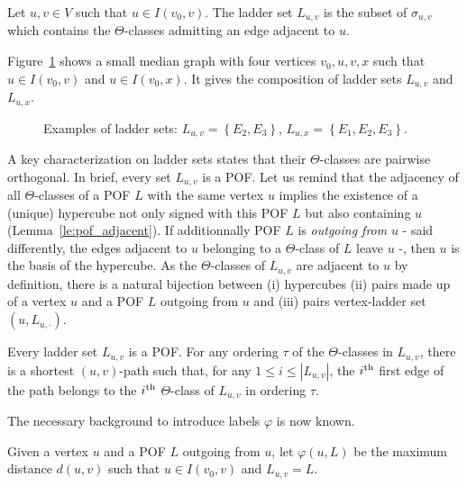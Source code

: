 \documentclass[a4paper,UKenglish,numberwithinsect,cleveref, autoref,anonymous]{lipics-v2021}
\newcommand{\set}[1]{\left\{ #1 \right\}}
\newcommand{\card}[1]{\left| #1 \right|}
\newcommand{\ith}[1]{#1^{\mbox{\scriptsize{th}}}}
\begin{document}
\begin{definition}
Let $u,v \in V$ such that $u \in I(v_0,v)$. The ladder set $L_{u,v}$ is the subset of $\sigma_{u,v}$ which contains the $\Theta$-classes admitting an edge adjacent to $u$.
\label{def:ladder}
\end{definition}

Figure~\ref{fig:compute_labels} shows a small median graph with four vertices $v_0,u,v,x$ such that $u \in I(v_0,v)$ and $u \in I(v_0,x)$. It gives the composition of ladder sets $L_{u,v}$ and $L_{u,x}$.

\begin{figure}[h]
\centering
\scalebox{0.8}{}
\caption{Examples of ladder sets: $L_{u,v} = \set{E_2,E_3}$, $L_{u,x} = \set{E_1,E_2,E_3}$.}
\label{fig:compute_labels}
\end{figure}

A key characterization on ladder sets states that their $\Theta$-classes are pairwise orthogonal. In brief, every set $L_{u,v}$ is a POF. Let us remind that the adjacency of all $\Theta$-classes of a POF $L$ with the same vertex $u$ implies the existence of a (unique) hypercube not only signed with this POF $L$ but also containing $u$ (Lemma~\ref{le:pof_adjacent}). If additionnally POF $L$ is \textit{outgoing from} $u$ - said differently, the edges adjacent to $u$ belonging to a $\Theta$-class of $L$ leave $u$ -, then $u$ is the basis of the hypercube.  As the $\Theta$-classes of $L_{u,v}$ are adjacent to $u$ by definition, there is a natural bijection between (i) hypercubes (ii) pairs made up of a vertex $u$ and a POF $L$ outgoing from $u$ and (iii) pairs vertex-ladder set $(u,L_{u,\cdot})$.

\begin{lemma}
Every ladder set $L_{u,v}$ is a POF. For any ordering $\tau$ of the $\Theta$-classes in $L_{u,v}$, there is a shortest $(u,v)$-path such that, for any $1\le i \le \card{L_{u,v}}$, the $\ith{i}$ first edge of the path belongs to the $\ith{i}$ $\Theta$-class of $L_{u,v}$ in ordering $\tau$.
\label{le:ladder_POF}
\end{lemma}

The necessary background to introduce labels $\varphi$ is now known.

\begin{definition}
Given a vertex $u$ and a POF $L$ outgoing from $u$, let $\varphi(u,L)$ be the maximum distance $d(u,v)$ such that $u \in I(v_0,v)$ and $L_{u,v} = L$.
\label{def:varphi}
\end{definition}
\end{document}
